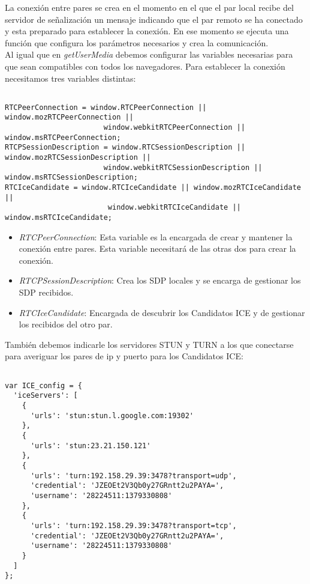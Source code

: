 La conexión entre pares se crea en el momento en el que el par local recibe del servidor de señalización un mensaje indicando que el par remoto se ha conectado y esta preparado para establecer la conexión. En ese momento se ejecuta una función que configura los parámetros necesarios y  crea la comunicación.\\

Al igual que en \emph{getUserMedia} debemos configurar las variables necesarias para que sean compatibles con todos los navegadores. Para establecer la conexión necesitamos tres variables distintas:\\


\begin{lstlisting}[caption=Variables WebRTC]

RTCPeerConnection = window.RTCPeerConnection || window.mozRTCPeerConnection || 
                       window.webkitRTCPeerConnection || window.msRTCPeerConnection;
RTCPSessionDescription = window.RTCSessionDescription || window.mozRTCSessionDescription ||
                       window.webkitRTCSessionDescription || window.msRTCSessionDescription;
RTCIceCandidate = window.RTCIceCandidate || window.mozRTCIceCandidate ||
                        window.webkitRTCIceCandidate || window.msRTCIceCandidate;

\end{lstlisting}

\begin{itemize}

\item \emph{RTCPeerConnection}: Esta variable es la encargada de crear y mantener la conexión entre pares. Esta variable necesitará de las otras dos para crear la conexión.
\item \emph{RTCPSessionDescription}: Crea los SDP locales y se encarga de gestionar los SDP recibidos.
\item \emph{RTCIceCandidate}: Encargada de descubrir los Candidatos ICE y de gestionar los recibidos del otro par.

\end{itemize}


También debemos indicarle los servidores STUN y TURN a los que conectarse para averiguar los pares de ip y puerto para los Candidatos ICE:\\

\begin{lstlisting}[caption=Servidores STUN y TURN]

var ICE_config = {
  'iceServers': [
    {
      'urls': 'stun:stun.l.google.com:19302'
    },
    {
      'urls': 'stun:23.21.150.121'
    },
    {
      'urls': 'turn:192.158.29.39:3478?transport=udp',
      'credential': 'JZEOEt2V3Qb0y27GRntt2u2PAYA=',
      'username': '28224511:1379330808'
    },
    {
      'urls': 'turn:192.158.29.39:3478?transport=tcp',
      'credential': 'JZEOEt2V3Qb0y27GRntt2u2PAYA=',
      'username': '28224511:1379330808'
    }
  ]
};

\end{lstlisting}

